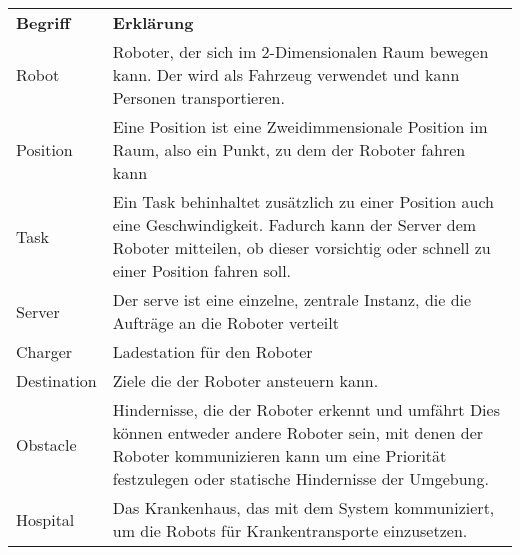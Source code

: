 	\begin{tabular}{ l p{10cm} }
		\textbf{Begriff} & \textbf{Erklärung}\\
		Robot & Roboter, der sich im 2-Dimensionalen Raum bewegen kann. Der wird
		als Fahrzeug verwendet und kann Personen transportieren.\\
		Position & Eine Position ist eine Zweidimmensionale Position im Raum,
		also ein Punkt, zu dem der Roboter fahren kann\\
		Task & Ein Task behinhaltet zusätzlich zu einer Position auch eine
		Geschwindigkeit. Fadurch kann der Server dem Roboter mitteilen, ob
		dieser vorsichtig oder schnell zu einer Position fahren
		soll.\\
		Server & Der serve ist eine einzelne, zentrale Instanz, die die Aufträge
		an die Roboter verteilt\\
		Charger & Ladestation für den Roboter\\
		Destination & Ziele die der Roboter ansteuern kann.\\
		Obstacle & Hindernisse, die der Roboter erkennt und umfährt Dies können
		entweder andere Roboter sein, mit denen der Roboter kommunizieren kann
		um eine Priorität festzulegen oder statische Hindernisse der
		Umgebung.\\
		Hospital & Das Krankenhaus, das mit dem System kommuniziert, um die Robots
		für Krankentransporte einzusetzen.
	\end{tabular}
